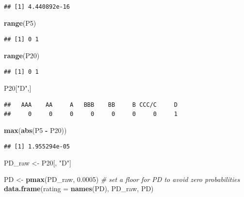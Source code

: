 \documentclass[
  11pt,
]{article}
\newenvironment{Shaded}{\begin{snugshade}}{\end{snugshade}}
\newcommand{\AttributeTok}[1]{\textcolor[rgb]{0.13,0.29,0.53}{#1}}
\newcommand{\CommentTok}[1]{\textcolor[rgb]{0.56,0.35,0.01}{\textit{#1}}}
\newcommand{\FloatTok}[1]{\textcolor[rgb]{0.00,0.00,0.81}{#1}}
\newcommand{\FunctionTok}[1]{\textcolor[rgb]{0.13,0.29,0.53}{\textbf{#1}}}
\newcommand{\NormalTok}[1]{#1}
\newcommand{\OtherTok}[1]{\textcolor[rgb]{0.56,0.35,0.01}{#1}}
\newcommand{\SpecialCharTok}[1]{\textcolor[rgb]{0.81,0.36,0.00}{\textbf{#1}}}
\newcommand{\StringTok}[1]{\textcolor[rgb]{0.31,0.60,0.02}{#1}}
\begin{document}
\begin{verbatim}
## [1] 4.440892e-16
\end{verbatim}

\begin{Shaded}
\begin{Highlighting}[]
\FunctionTok{range}\NormalTok{(P5)}
\end{Highlighting}
\end{Shaded}

\begin{verbatim}
## [1] 0 1
\end{verbatim}

\begin{Shaded}
\begin{Highlighting}[]
\FunctionTok{range}\NormalTok{(P20)}
\end{Highlighting}
\end{Shaded}

\begin{verbatim}
## [1] 0 1
\end{verbatim}

\begin{Shaded}
\begin{Highlighting}[]
\NormalTok{P20[}\StringTok{"D"}\NormalTok{,]}
\end{Highlighting}
\end{Shaded}

\begin{verbatim}
##   AAA    AA     A   BBB    BB     B CCC/C     D 
##     0     0     0     0     0     0     0     1
\end{verbatim}

\begin{Shaded}
\begin{Highlighting}[]
\FunctionTok{max}\NormalTok{(}\FunctionTok{abs}\NormalTok{(P5 }\SpecialCharTok{{-}}\NormalTok{ P20))}
\end{Highlighting}
\end{Shaded}

\begin{verbatim}
## [1] 1.955294e-05
\end{verbatim}

\begin{Shaded}
\begin{Highlighting}[]
\NormalTok{PD\_raw }\OtherTok{\textless{}{-}}\NormalTok{ P20[, }\StringTok{"D"}\NormalTok{]}

\NormalTok{PD }\OtherTok{\textless{}{-}} \FunctionTok{pmax}\NormalTok{(PD\_raw, }\FloatTok{0.0005}\NormalTok{) }\CommentTok{\# set a floor for PD to avoid zero probabilities}
\FunctionTok{data.frame}\NormalTok{(}\AttributeTok{rating =} \FunctionTok{names}\NormalTok{(PD), PD\_raw, PD)}
\end{Highlighting}
\end{Shaded}
\end{document}
